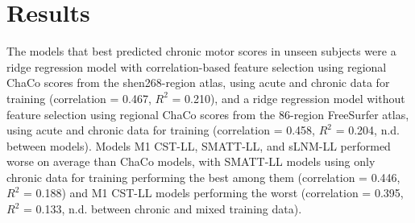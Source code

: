 \documentclass[10pt]{article}
\begin{document}
\section{Results}
The models that best predicted chronic motor scores in unseen subjects were a ridge regression model with correlation-based feature selection using regional ChaCo scores from the shen268-region atlas, using acute and chronic data for training (correlation = 0.467, $R^2$ = 0.210), and a ridge regression model without feature selection using regional ChaCo scores from the 86-region FreeSurfer atlas, using acute and chronic data for training (correlation = 0.458, $R^2$ = 0.204, n.d. between models). Models M1 CST-LL, SMATT-LL, and sLNM-LL performed worse on average than ChaCo models, with SMATT-LL models using only chronic data for training performing the best among them (correlation = 0.446, $R^2$ = 0.188) and M1 CST-LL models performing the worst (correlation = 0.395, $R^2$ = 0.133, n.d. between chronic and mixed training data). 




\newpage 
\newpage
\end{document}
